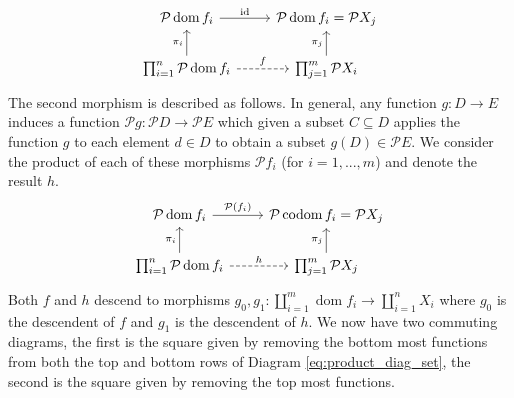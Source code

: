 \documentclass{birkjour}
\theoremstyle{plain}
\theoremstyle{definition}
\newcommand{\call}[1]{\mathcal{#1}}
\newcommand{\lto}{\longrightarrow}
\begin{document}
\[\begin{tikzcd}
	{\call{P}\operatorname{dom}f_i} & {\call{P}\operatorname{dom}f_i = \call{P}X_j} \\
	{\prod_{i = 1}^n \call{P}\operatorname{dom}f_i} & {\prod_{j = 1}^m \call{P}X_i}
	\arrow["{\operatorname{id}}", from=1-1, to=1-2]
	\arrow[dashed, "{f}", from=2-1, to=2-2]
	\arrow["{\pi_i}", from=2-1, to=1-1]
	\arrow["{\pi_j}", from=2-2, to=1-2]
\end{tikzcd}\]
The second morphism is described as follows. In general, any function $g: D \lto E$ induces a function $\call{P}g: \call{P}D \lto \call{P}E$ which given a subset $C \subseteq D$ applies the function $g$ to each element $d \in D$ to obtain a subset $g(D) \in \call{P}E$. We consider the product of each of these morphisms $\call{P} f_i$ (for $i = 1,...,m$) and denote the result $h$.
\[\begin{tikzcd}
	{\call{P}\operatorname{dom}f_i} & {\call{P}\operatorname{codom}f_i = \call{P}X_j} \\
	{\prod_{i = 1}^n\call{P}\operatorname{dom}f_i} & {\prod_{j = 1}^m \call{P}X_j}
	\arrow["{\pi_j}", from=2-2, to=1-2]
	\arrow["{\pi_i}", from=2-1, to=1-1]
	\arrow["{\call{P}(f_i)}", from=1-1, to=1-2]
	\arrow[dashed, "h", from=2-1, to=2-2]
\end{tikzcd}\]
Both $f$ and $h$ descend to morphisms $g_0,g_1: \coprod_{i = 1}^m \operatorname{dom}f_i\lto \coprod_{i = 1}^n X_i$ where $g_0$ is the descendent of $f$ and $g_1$ is the descendent of $h$. We now have two commuting diagrams, the first is the square given by removing the bottom most functions from both the top and bottom rows of Diagram \ref{eq:product_diag_set}, the second is the square given by removing the top most functions.
\end{document}
